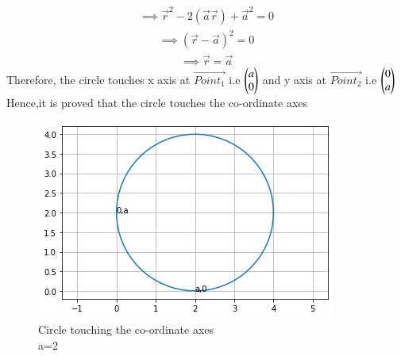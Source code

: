 \begin {align}
\implies\vec{r}^2 -2\left(\vec{a}\vec{r}\right)+\vec{a}^2=0
\end{align}
\begin {align}
\implies\left(\vec{r}- \vec{a}\right)^2=0
\end{align}
\begin{align}
\implies\vec{r}= \vec{a}
\end{align}
Therefore, the circle touches x axis at $\vec{Point_{1}}$ i.e $\begin{pmatrix} a \\ 0\end{pmatrix}$ and y axis at $\vec{Point_{2}}$ i.e $\begin{pmatrix} 0\\ a\end{pmatrix}$ \\
Hence,it is proved that the circle touches the co-ordinate axes
\begin{figure}[h!]
\centering
\includegraphics[width=\columnwidth]{./solutions/4/2/5/circle new.png}
\caption{Circle touching the co-ordinate axes \\a=2}
\label{eq:solutions/4/2/5/}
\end{figure}
